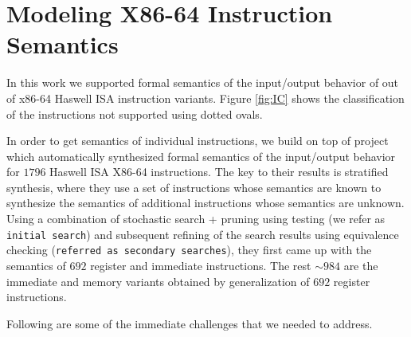 
\section{Modeling X86-64 Instruction Semantics} \label{sec:modelI}


In this work we supported formal semantics of the input/output behavior of
\supp{} out of \total{} x86-64 Haswell ISA instruction variants. Figure \ref{fig:IC} shows the classification of the instructions not supported using dotted ovals.  


In order to get semantics of individual instructions, we build on top of project
\Strata~\cite{Heule2016a} which automatically synthesized formal semantics  of
the input/output behavior for $1796$ Haswell ISA X86-64 instructions. The key to
their results is stratified synthesis, where they use a set of instructions
whose semantics are known to synthesize the semantics of additional instructions
whose semantics are unknown. Using a  combination of 
stochastic search + pruning using testing (we refer as {\tt initial search}) and subsequent refining of the search results using equivalence checking ({\tt referred as secondary searches}), they first came up with the
semantics of $692$ register and  immediate instructions. The rest
$\sim984$ are the immediate and memory variants obtained by generalization of
$692$ register instructions.     




Following are some of the immediate challenges that we needed to address.

